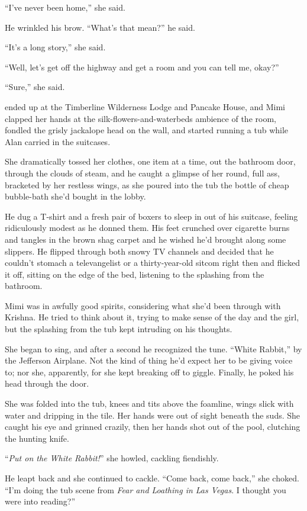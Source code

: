 ``I've never been home,'' she said.

He wrinkled his brow.  ``What's that mean?'' he said.

``It's a long story,'' she said.

``Well, let's get off the highway and get a room and you can tell me,
okay?''

``Sure,'' she said.

 ended up at the Timberline Wilderness Lodge and Pancake House,
and Mimi clapped her hands at the silk-flowers-and-waterbeds ambience
of the room, fondled the grisly jackalope head on the wall, and
started running a tub while Alan carried in the suitcases.

She dramatically tossed her clothes, one item at a time, out the
bathroom door, through the clouds of steam, and he caught a glimpse of
her round, full ass, bracketed by her restless wings, as she poured
into the tub the bottle of cheap bubble-bath she'd bought in the
lobby.

He dug a T-shirt and a fresh pair of boxers to sleep in out of his
suitcase, feeling ridiculously modest as he donned them.  His feet
crunched over cigarette burns and tangles in the brown shag carpet and
he wished he'd brought along some slippers.  He flipped through both
snowy TV channels and decided that he couldn't stomach a televangelist
or a thirty-year-old sitcom right then and flicked it off, sitting on
the edge of the bed, listening to the splashing from the bathroom.

Mimi was in awfully good spirits, considering what she'd been through
with Krishna.  He tried to think about it, trying to make sense of the
day and the girl, but the splashing from the tub kept intruding on his
thoughts.

She began to sing, and after a second he recognized the tune.  ``White
Rabbit,'' by the Jefferson Airplane.  Not the kind of thing he'd
expect her to be giving voice to; nor she, apparently, for she kept
breaking off to giggle.  Finally, he poked his head through the door.

She was folded into the tub, knees and tits above the foamline, wings
slick with water and dripping in the tile.  Her hands were out of
sight beneath the suds.  She caught his eye and grinned crazily, then
her hands shot out of the pool, clutching the hunting knife.

``\textit{Put on the White Rabbit!}'' she howled, cackling fiendishly.

He leapt back and she continued to cackle.  ``Come back, come back,''
she choked.  ``I'm doing the tub scene from \textit{Fear and Loathing
in Las Vegas}.  I thought you were into reading?''

